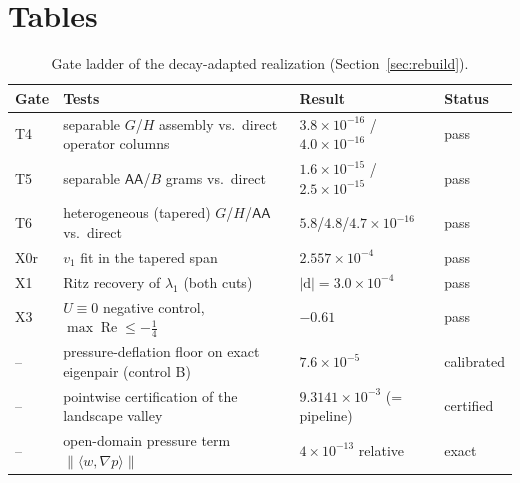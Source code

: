 \documentclass[11pt]{article}
\theoremstyle{plain}
\theoremstyle{remark}
\begin{document}
\appendix
\section{Tables}\label{app:tables}

\begin{table}[h]
\centering\small
\begin{tabular}{llll}
\toprule
Gate & Tests & Result & Status \\
\midrule
T4 & separable $G$/$H$ assembly vs.\ direct operator columns &
$3.8\times 10^{-16}$ / $4.0\times 10^{-16}$ & pass \\
T5 & separable $\mathsf{AA}$/$B$ grams vs.\ direct &
$1.6\times 10^{-15}$ / $2.5\times 10^{-15}$ & pass \\
T6 & heterogeneous (tapered) $G$/$H$/$\mathsf{AA}$ vs.\ direct &
$5.8$/$4.8$/$4.7\times 10^{-16}$ & pass \\
X0r & $v_1$ fit in the tapered span &
$2.557\times 10^{-4}$ & pass \\
X1 & Ritz recovery of $\lambda_1$ (both cuts) &
$|\mathrm{d}| = 3.0\times 10^{-4}$ & pass \\
X3 & $U \equiv 0$ negative control, $\max\operatorname{Re} \le
-\tfrac14$ & $-0.61$ & pass \\
-- & pressure-deflation floor on exact eigenpair (control B) &
$7.6\times 10^{-5}$ & calibrated \\
-- & pointwise certification of the landscape valley &
$9.3141\times 10^{-3}$ (= pipeline) & certified \\
-- & open-domain pressure term $\|\langle w,\nabla p\rangle\|$ &
$4\times 10^{-13}$ relative & exact \\
\bottomrule
\end{tabular}
\caption{Gate ladder of the decay-adapted realization
(Section~\ref{sec:rebuild}).}
\label{tab:gates}
\end{table}
\end{document}
